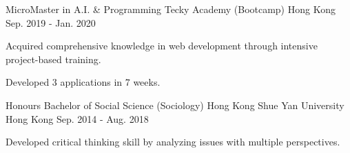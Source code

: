 

\begin{cventries}

  \cventry
    {MicroMaster in A.I. \& Programming} %
    {Tecky Academy (Bootcamp)} %
    {Hong Kong} %
    {Sep. 2019 - Jan. 2020} %
    {
      \begin{cvitems} %
        \item {Acquired comprehensive knowledge in web development through intensive project-based training.}
        \item {Developed 3 applications in 7 weeks.}
      \end{cvitems}
    }
  \cventry
    {Honours Bachelor of Social Science (Sociology)} %
    {Hong Kong Shue Yan University} %
    {Hong Kong} %
    {Sep. 2014 - Aug. 2018} %
    {
      \begin{cvitems} %
        \item {Developed critical thinking skill by analyzing issues with multiple perspectives.}
      \end{cvitems}
    }

\end{cventries}
